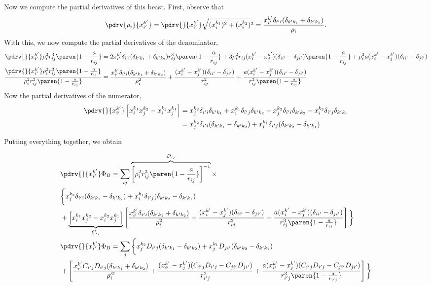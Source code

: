 \documentclass[onecolumn,amsmath,amssymb,nofootinbib,floatfix]{revtex4}
\begin{document}
Now we compute the partial derivatives of this beast.  First, observe that
$$\pdrv{\rho_i}{x_{i'}^{k'}} = \pdrv{}{x_{i'}^{k'}}\sqrt{(x_i^{k_1})^2+(x_i^{k_2})^2} = \frac{x_{i'}^{k'}\delta_{i'i}(\delta_{k'k_1} + \delta_{k'k_2})}{\rho_i}.$$
With this, we now compute the partial derivatives of the denominator,
$$
\begin{aligned}
\pdrv{}{x_{i'}^{k'}} \rho_i^2 r_{ij}^3\paren{1-\frac{a}{r_{ij}}}
&=  2x_{i'}^{k'}\delta_{i'i}(\delta_{k'k_1} + \delta_{k'k_2}) r_{ij}^3\paren{1-\frac{a}{r_{ij}}}
      +3\rho_i^2 r_{ij}(x_i^{k'}-x_j^{k'})(\delta_{ii'}-\delta_{ji'})\paren{1-\frac{a}{r_{ij}}}
      + \rho_i^2 a (x_i^{k'}-x_j^{k'})(\delta_{ii'}-\delta_{ji'})\\
\frac{\pdrv{}{x_{i'}^{k'}} \rho_i^2 r_{ij}^3\paren{1-\frac{a}{r_{ij}}}}{\rho_i^2 r_{ij}^3\paren{1-\frac{a}{r_{ij}}}}
&=  \frac{x_{i'}^{k'}\delta_{i'i}(\delta_{k'k_1} + \delta_{k'k_2})}{\rho_i^2}
      +\frac{(x_i^{k'}-x_j^{k'})(\delta_{ii'}-\delta_{ji'})}{r_{ij}^2}
      + \frac{a (x_i^{k'}-x_j^{k'})(\delta_{ii'}-\delta_{ji'})}{r_{ij}^3\paren{1-\frac{a}{r_{ij}}}}\\
\end{aligned}
$$
Now the partial derivatives of the numerator,
$$
\begin{aligned}
\pdrv{}{x_{i'}^{k'}}\left[x_i^{k_1}x_j^{k_2}-x_i^{k_2}x_j^{k_1}\right]
&= 
x_j^{k_2}\delta_{i'i}\delta_{k'k_1}+x_i^{k_1}\delta_{i'j}\delta_{k'k_2}
-x_j^{k_2}\delta_{i'i}\delta_{k'k_2}-x_i^{k_2}\delta_{i'j}\delta_{k'k_1}\\
&= x_j^{k_2}\delta_{i'i}(\delta_{k'k_1}-\delta_{k'k_2})+x_i^{k_1}\delta_{i'j}(\delta_{k'k_2}-\delta_{k'k_1})\\
\end{aligned}
$$

Putting everything together, we obtain

$$
\begin{aligned}
&\pdrv{}{x_{i'}^{k'}}\Phi_{B} = \sum_{ij} \overbrace{\left[\rho_i^2 r_{ij}^3\paren{1-\frac{a}{r_{ij}}}\right]^{-1}}^{D_{ij}}\times \\ &\bigg\{x_j^{k_2}\delta_{i'i}(\delta_{k'k_1}-\delta_{k'k_2})+x_i^{k_1}\delta_{i'j}(\delta_{k'k_2}-\delta_{k'k_1}) \\
&+ \underbrace{\left[x_i^{k_1}x_j^{k_2}-x_i^{k_2}x_j^{k_1}\right]}_{C_{ij}}\left[\frac{x_{i'}^{k'}\delta_{i'i}(\delta_{k'k_1} + \delta_{k'k_2})}{\rho_i^2}
      +\frac{(x_i^{k'}-x_j^{k'})(\delta_{ii'}-\delta_{ji'})}{r_{ij}^2}
      + \frac{a (x_i^{k'}-x_j^{k'})(\delta_{ii'}-\delta_{ji'})}{r_{ij}^3\paren{1-\frac{a}{r_{ij}}}}\right]\bigg\}\\
&\pdrv{}{x_{i'}^{k'}}\Phi_{B} = \sum_{j} \bigg\{x_j^{k_2}D_{i'j}(\delta_{k'k_1}-\delta_{k'k_2})+x_j^{k_1}D_{ji'}(\delta_{k'k_2}-\delta_{k'k_1}) \\
&+ \left[\frac{x_{i'}^{k'}C_{i'j}D_{i'j}(\delta_{k'k_1} + \delta_{k'k_2})}{\rho_i'^2}
      +\frac{(x_{i'}^{k'}-x_j^{k'})(C_{i'j}D_{i'j}-C_{ji'}D_{ji'})}{r_{i'j}^2}
      + \frac{a (x_{i'}^{k'}-x_j^{k'})(C_{i'j}D_{i'j}-C_{ji'}D_{ji'})}{r_{i'j}^3\paren{1-\frac{a}{r_{i'j}}}}\right]\bigg\}\\
\end{aligned}
$$
\end{document}
